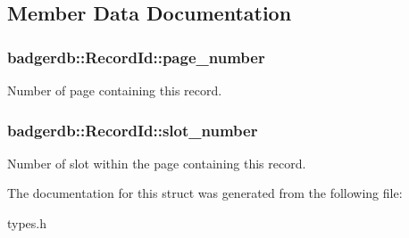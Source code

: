 \subsection{Member Data Documentation}
\hypertarget{structbadgerdb_1_1RecordId_aca5e770e2726e51efed3a47c6457cd94}{
\subsubsection[{page\-\_\-number}]{ badgerdb\-::\-Record\-Id\-::page\-\_\-number}}\label{structbadgerdb_1_1RecordId_aca5e770e2726e51efed3a47c6457cd94}
Number of page containing this record. \hypertarget{structbadgerdb_1_1RecordId_a19ec7b749099499446fdd24d48cec9ef}{
\subsubsection[{slot\-\_\-number}]{ badgerdb\-::\-Record\-Id\-::slot\-\_\-number}}\label{structbadgerdb_1_1RecordId_a19ec7b749099499446fdd24d48cec9ef}
Number of slot within the page containing this record. 

The documentation for this struct was generated from the following file\-:\begin{DoxyCompactItemize}
\item 
types.\-h\end{DoxyCompactItemize}
